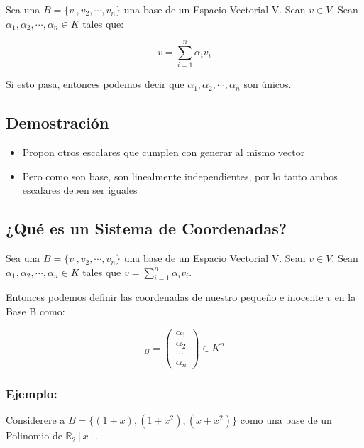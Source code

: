 \documentclass[12pt]{report}							    %
\begin{document}
        Sea una $B = \{ v_!, v_2, \cdots, v_n\}$ una base de un Espacio Vectorial V.
        Sean $v \in V$.
        Sean $\alpha_1, \alpha_2, \cdots, \alpha_n \in K$ tales que:

        \begin{equation}
            v = \sum_{i=1}^{n} \alpha_i v_i
        \end{equation}

        Si esto pasa, entonces podemos decir que  $\alpha_1, \alpha_2, \cdots, \alpha_n$ son únicos.

        \subsection{Demostración}
        \begin{itemize}
            \item Propon otros escalares que cumplen con generar al mismo vector
            \item Pero como son base, son linealmente independientes, por lo tanto ambos escalares deben ser iguales
        \end{itemize}


        \subsection{¿Qué es un Sistema de Coordenadas?}
        Sea una $B = \{ v_!, v_2, \cdots, v_n\}$ una base de un Espacio Vectorial V.
        Sean $v \in V$.
        Sean $\alpha_1, \alpha_2, \cdots, \alpha_n \in K$ tales que $v = \sum_{i=1}^{n} \alpha_i v_i$.

        Entonces podemos definir las coordenadas de nuestro pequeño e inocente $v$ en la Base B como:

        \begin{equation}
            [v]_B = 
            \begin{pmatrix} 
                \alpha_1    \\
                \alpha_2    \\
                \cdots      \\
                \alpha_n 
            \end{pmatrix}
            \in K^n
        \end{equation}


        \clearpage

        \subsubsection{Ejemplo:}
        Considerere a $B = \{ (1+x), (1+x^2) , (x + x^2) \}$ como una base de un Polinomio de $\mathbb{R}_2[x]$.
\end{document}
